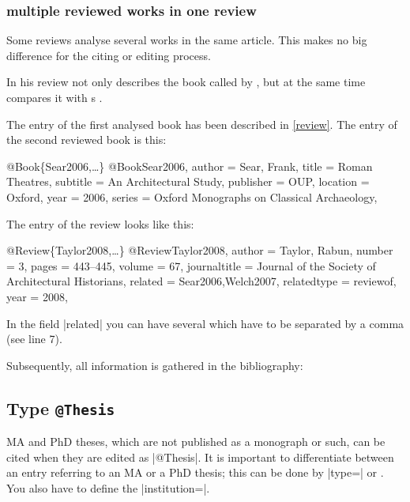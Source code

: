 \documentclass[a4paper,
10pt,
greek,
french,
spanish,
italian,
ngerman,
english,
]{ltxdoc}
\begin{document}


\subsubsection{multiple reviewed works in one review}
Some reviews analyse several works in the same article. 
This makes no big difference for the citing or editing process.

In his review
\citeauthor{Taylor2008} not only describes the book called
  by \citeauthor{Welch2007}, 
 but at the same time compares it with \citeauthor{Sear2006}s .

The entry of the first analysed book  has been described in \cref{review}.
The entry of the second reviewed book is this:
\begin{bibexample}[label=Sear2006]{{@}Book\{Sear2006,…\}}
@Book{Sear2006,
  author     = {Sear, Frank},
  title      = {Roman Theatres},
  subtitle   = {An Architectural Study},
  publisher  = OUP,    %
  location   = {Oxford},
  year       = {2006},
  series     = {Oxford Monographs on Classical Archaeology},
}
\end{bibexample}

The entry of the review looks like this:
\begin{bibexample}[label=Taylor2008]{{@}Review\{Taylor2008,…\}}
@Review{Taylor2008,
  author       = {Taylor, Rabun},
  number       = {3},
  pages        = {443--445},
  volume       = {67},
  journaltitle = {Journal of the Society of Architectural Historians},
  related      = {Sear2006,Welch2007},
  relatedtype  = {reviewof},
  year         = {2008},
}
\end{bibexample}
In the field |related| you can have several  which have to be separated by a comma (see line 7).

Subsequently, all information is gathered in the bibliography:


 \subsection{Type \texttt{@Thesis}}\label{thesis}
MA and PhD theses, which are not published as a monograph or such, can be cited when they are edited as |@Thesis|.
It is important to differentiate between an entry referring to an MA or a PhD thesis;
this can be done by |type=| or
 . 
You also have to define the  |institution=|.
 
\end{document}
